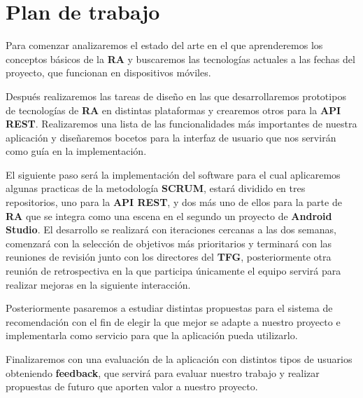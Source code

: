 \newpage
\section{Plan de trabajo}
\begin{flushleft}
    Para comenzar analizaremos el estado del arte en el que aprenderemos los conceptos
     básicos de la \textbf{RA} y buscaremos las tecnologías actuales a las fechas del proyecto,
     que funcionan en dispositivos móviles.
\end{flushleft}

\begin{flushleft}     
    Después realizaremos las tareas de diseño en las que desarrollaremos prototipos de
     tecnologías de \textbf{RA} en distintas plataformas y crearemos otros para la \textbf{API REST}.
     Realizaremos una lista de las funcionalidades más importantes de nuestra aplicación
     y diseñaremos bocetos para la interfaz de usuario que nos servirán como guía en
     la implementación.
\end{flushleft}

\begin{flushleft}    
    El siguiente paso será la implementación del software para el cual aplicaremos
     algunas practicas de la metodología \textbf{SCRUM}, estará dividido en tres repositorios, uno para la
     \textbf{API REST}, y dos más uno de ellos para la parte de \textbf{RA} que se integra como una
     escena en el segundo un proyecto de \textbf{Android Studio}. El desarrollo se realizará
     con iteraciones cercanas a las dos semanas, comenzará con la selección de
     objetivos más prioritarios y terminará con las reuniones de revisión junto
     con los directores del \textbf{TFG}, posteriormente otra reunión de retrospectiva en
     la que participa únicamente el equipo servirá para realizar mejoras en la
     siguiente interacción.
\end{flushleft}

\begin{flushleft}
    Posteriormente pasaremos a estudiar distintas propuestas para el sistema
     de recomendación con el fin de elegir la que mejor se adapte a nuestro
     proyecto e implementarla como servicio para que la aplicación pueda
     utilizarlo.
\end{flushleft}

\begin{flushleft}        
    Finalizaremos con una evaluación de la aplicación con distintos tipos de
     usuarios obteniendo \textbf{feedback}, que servirá para evaluar nuestro trabajo y
     realizar propuestas de futuro que aporten valor a nuestro proyecto.
\end{flushleft}
\label{makereference1.3}



